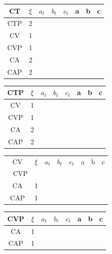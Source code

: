 \documentclass[twocolumn]{article}
\begin{document}
\begin{table}[H]
	\begin{tabular}{|c|c|c|c|c|c|c|c|}
		\hline
		CT & $\xi $& $a_t$ & $b_t$ & $c_t$ & a & b & c \\
		\hline
		CTP & 2 &   &   &   &   &   &   \\
		\hline
		CV & 1 &   &   &   &   &   &   \\
		\hline
		CVP & 1 &   &   &   &   &   &   \\
		\hline
		CA & 2 &   &   &   &   &   &   \\
		\hline
		CAP & 2 &   &   &   &   &   &   \\
		\hline
	\end{tabular}
\end{table}

\begin{table}[H]
	\begin{tabular}{|c|c|c|c|c|c|c|c|}
		\hline
		CTP & $\xi $& $a_t$ & $b_t$ & $c_t$ & a & b & c \\
		\hline
		CV & 1 &   &   &   &   &   &   \\
		\hline
		CVP & 1 &   &   &   &   &   &   \\
		\hline
		CA & 2 &   &   &   &   &   &   \\
		\hline
		CAP & 2 &   &   &   &   &   &   \\
		\hline
	\end{tabular}
\end{table}

\begin{table}[H]
	\begin{tabular}{|c|c|c|c|c|c|c|c|}
		\hline
		CV & $\xi $& $a_t$ & $b_t$ & $c_t$ & a & b & c \\\
		\hline
		CVP &   &   &   &   &   &   &   \\
		\hline
		CA & 1 &   &   &   &   &   &   \\
		\hline
		CAP & 1 &   &   &   &   &   &   \\
		\hline
	\end{tabular}
\end{table}


\begin{table}[H]
	\begin{tabular}{|c|c|c|c|c|c|c|c|}
		\hline
		CVP & $\xi $& $a_t$ & $b_t$ & $c_t$ & a & b & c \\
		\hline
		CA & 1 &   &   &   &   &   &   \\
		\hline
		CAP & 1 &   &   &   &   &   &   \\
		\hline
	\end{tabular}
\end{table}
\end{document}
